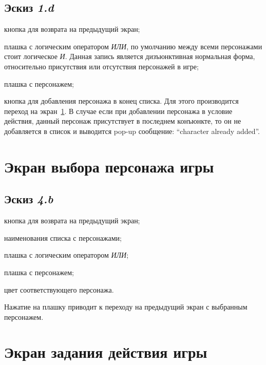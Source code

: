 \subsection{Эскиз \emph{1.d}}
\begin{enumerate*}
    \item кнопка для возврата на предыдущий экран;
    \item плашка с логическим оператором \emph{ИЛИ}, по умолчанию между всеми персонажами стоит логическое \emph{И}. Данная запись является дизъюнктивная нормальная форма, относительно присутствия или отсутствия персонажей в игре;
    \item плашка с персонажем;
    \item кнопка для добавления персонажа в конец списка. Для этого производится переход на экран~\ref{lbl:game-character-list}. В случае если при добавлении персонажа в условие действия, данный персонаж присутствует в последнем конъюнкте, то он не добавляется в список и выводится pop-up сообщение: ``character already added''.
\end{enumerate*}

\section{Экран выбора персонажа игры}\label{lbl:game-character-list}

\subsection{Эскиз \emph{4.b}}
\begin{enumerate*}
    \item кнопка для возврата на предыдущий экран;
    \item наименования списка с персонажами;
    \item плашка с логическим оператором \emph{ИЛИ};
    \item плашка с персонажем;
    \item цвет соответствующего персонажа.
\end{enumerate*}

Нажатие на плашку приводит к переходу на предыдущий экран с выбранным персонажем.

\section{Экран задания действия игры}\label{lbl:game-action-new}

